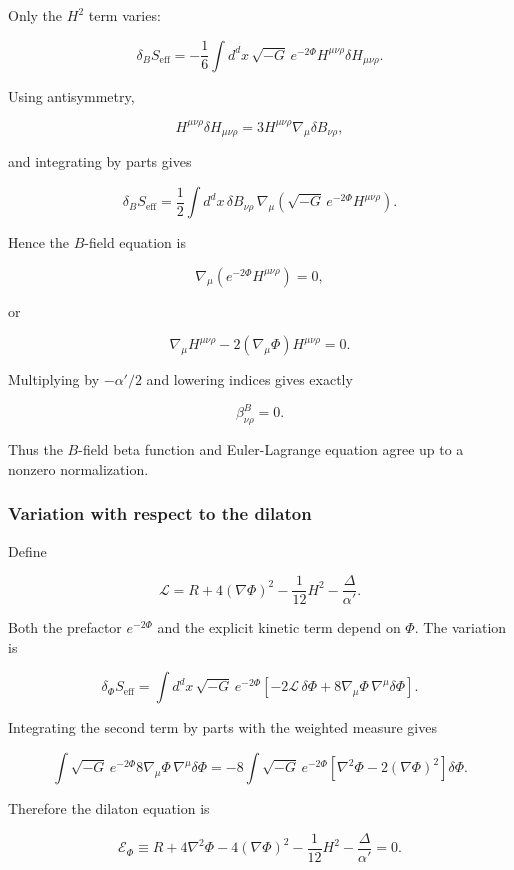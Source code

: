 \documentclass[
  10pt,
  a4paper,
  openany]{book}
\begin{document}
Only the \(H^2\) term varies:

\[
\delta_BS_{\mathrm{eff}}
=-\frac16
\int d^dx\,\sqrt{-G}\,e^{-2\Phi}
H^{\mu\nu\rho}\delta H_{\mu\nu\rho}.
\]

Using antisymmetry,

\[
H^{\mu\nu\rho}\delta H_{\mu\nu\rho}
=3H^{\mu\nu\rho}\nabla_\mu\delta B_{\nu\rho},
\]

and integrating by parts gives

\[
\delta_BS_{\mathrm{eff}}
=\frac12
\int d^dx\,
\delta B_{\nu\rho}\,
\nabla_\mu
\left(
\sqrt{-G}\,e^{-2\Phi}H^{\mu\nu\rho}
\right).
\]

Hence the \(B\)-field equation is

\[
\nabla_\mu\left(e^{-2\Phi}H^{\mu\nu\rho}\right)=0,
\]

or

\[
\nabla_\mu H^{\mu\nu\rho}
-2(\nabla_\mu\Phi)H^{\mu\nu\rho}=0.
\]

Multiplying by \(-\alpha'/2\) and lowering indices gives exactly

\[
\boxed{
\beta^B_{\nu\rho}=0.
}
\]

Thus the \(B\)-field beta function and Euler-Lagrange equation agree up
to a nonzero normalization.

\subsubsection{Variation with respect to the
dilaton}\label{variation-with-respect-to-the-dilaton}

Define

\[
\mathcal L
=R+4(\nabla\Phi)^2-\frac1{12}H^2-\frac{\Delta}{\alpha'}.
\]

Both the prefactor \(e^{-2\Phi}\) and the explicit kinetic term depend
on \(\Phi\). The variation is

\[
\delta_\Phi S_{\mathrm{eff}}
=\int d^dx\,\sqrt{-G}\,e^{-2\Phi}
\left[
-2\mathcal L\,\delta\Phi
+8\nabla_\mu\Phi\,\nabla^\mu\delta\Phi
\right].
\]

Integrating the second term by parts with the weighted measure gives

\[
\int\sqrt{-G}\,e^{-2\Phi}
8\nabla_\mu\Phi\,\nabla^\mu\delta\Phi
=
-8\int\sqrt{-G}\,e^{-2\Phi}
\left[
\nabla^2\Phi-2(\nabla\Phi)^2
\right]\delta\Phi.
\]

Therefore the dilaton equation is

\[
\boxed{
\mathcal E_\Phi
\equiv
R
+4\nabla^2\Phi
-4(\nabla\Phi)^2
-\frac1{12}H^2
-\frac{\Delta}{\alpha'}
=0.
}
\]
\end{document}

